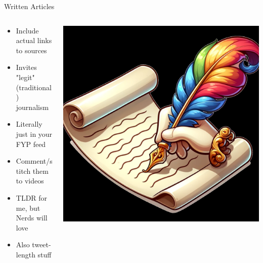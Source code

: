 \documentclass[aspectratio=169]{beamer}
\begin{document}
\begin{frame}{Written Articles}
\begin{columns}[T]
    \begin{column}[T]{0.5\textwidth}
        \begin{itemize}
            \item Include actual links to sources
            \item Invites "legit" (traditional) journalism
            \item Literally just in your FYP feed
            \item Comment/stitch them to videos
            \item TLDR for me, but Nerds will love
            \item Also tweet-length stuff
        \end{itemize}
    \end{column}
    \begin{column}{0.5\textwidth}
        \includegraphics[height=0.8\textheight]{imgs/media/quil.png}
    \end{column}
\end{columns}
\end{frame}
\end{document}

